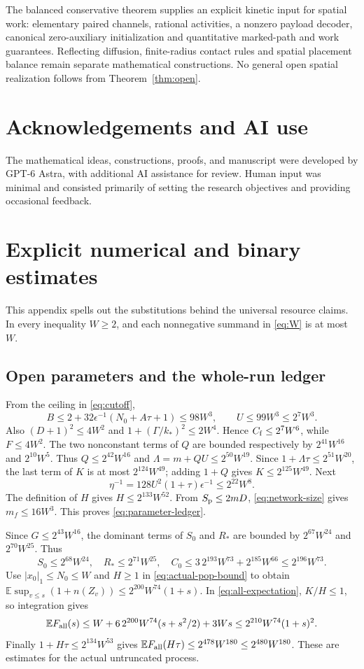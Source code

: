 \documentclass[11pt,reqno]{amsart}
\theoremstyle{definition}
\theoremstyle{remark}
\newcommand{\E}{\mathbb E}
\begin{document}
The balanced conservative theorem supplies an explicit kinetic input for
spatial work: elementary paired channels, rational activities, a nonzero
payload decoder, canonical zero-auxiliary initialization and quantitative
marked-path and work guarantees. Reflecting diffusion, finite-radius contact
rules and spatial placement balance remain separate mathematical constructions.
No general open spatial realization follows from Theorem~\ref{thm:open}.

\section*{Acknowledgements and AI use}
The mathematical ideas, constructions, proofs, and manuscript were developed by
GPT-6 Astra, with additional AI assistance for review. Human input was minimal
and consisted primarily of setting the research objectives and providing
occasional feedback.
\appendix
\section{Explicit numerical and binary estimates}\label{app:resources}
This appendix spells out the substitutions behind the universal resource
claims. In every inequality $W\ge2$, and each nonnegative summand in
\eqref{eq:W} is at most $W$.

\subsection{Open parameters and the whole-run ledger}
From the ceiling in \eqref{eq:cutoff},
\[
 B\le2+32\epsilon^{-1}(N_0+A\tau+1)\le98W^3,
 \qquad U\le99W^3\le2^7W^3.
\]
Also $(D+1)^2\le4W^2$ and
$1+(\Gamma/k_*)^2\le2W^4$. Hence
$C_{\rm f}\le2^7W^6$, while $F\le4W^2$.
The two nonconstant terms of $Q$ are bounded respectively by
$2^{41}W^{16}$ and $2^{10}W^5$. Thus $Q\le2^{42}W^{16}$ and
$\Lambda=m+QU\le2^{50}W^{19}$. Since
$1+\Lambda\tau\le2^{51}W^{20}$, the last term of $K$ is at most
$2^{124}W^{49}$; adding $1+Q$ gives $K\le2^{125}W^{49}$.
Next
\[
 \eta^{-1}=128U^2(1+\tau)\epsilon^{-1}\le2^{22}W^8.
\]
The definition of $H$ gives $H\le2^{133}W^{52}$. From
$S_{\rm p}\le2mD$, \eqref{eq:network-size} gives $m_f\le16W^3$.
This proves \eqref{eq:parameter-ledger}.

Since $G\le2^{43}W^{16}$, the dominant terms of $S_0$ and $R_*$ are bounded
by $2^{67}W^{24}$ and $2^{70}W^{25}$. Thus
\[
 S_0\le2^{68}W^{24},\quad R_*\le2^{71}W^{25},\quad
 C_0\le3\,2^{193}W^{73}+2^{185}W^{66}\le2^{196}W^{73}.
\]
Use $|x_0|_1\le N_0\le W$ and $H\ge1$ in
\eqref{eq:actual-pop-bound} to obtain
$\E\sup_{v\le s}(1+n(Z_v))\le2^{200}W^{74}(1+s)$.
In \eqref{eq:all-expectation}, $K/H\le1$, so integration gives
\[
 \E F_{\rm all}(s)
 \le W+6\,2^{200}W^{74}(s+s^2/2)+3Ws
 \le2^{210}W^{74}(1+s)^2.
\]
Finally $1+H\tau\le2^{134}W^{53}$ gives
$\E F_{\rm all}(H\tau)\le2^{478}W^{180}\le2^{480}W^{180}$.
These are estimates for the actual untruncated process.
\end{document}
